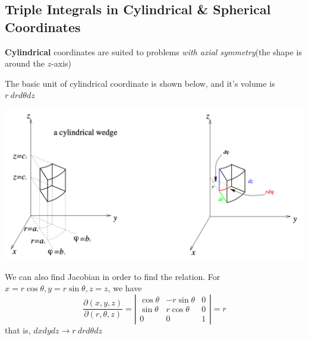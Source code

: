 \begin{spacing}{1.3}
    \newpage
    \section{Triple Integrals in Cylindrical \& Spherical Coordinates}

    {\bf Cylindrical} coordinates are suited to problems {\it with axial symmetry}(the shape 
    is around the $z$-axis)

    The basic unit of cylindrical coordinate is shown below, and it's volume is $r\ drd\theta dz$
    \begin{center}
        \includegraphics[scale=0.43]{images/Ch14-int-cylind.png}
    \end{center}
    We can also find Jacobian in order to find the relation. For $x=r\cos \theta, y=r\sin\theta,z=z$, we have
    $$\frac{\partial(x,y,z)}{\partial(r,\theta,z)}=
    \left|\begin{array}{ccc}
        \cos\theta & -r\sin\theta & 0\\
        \sin\theta & r\cos\theta & 0\\
        0 & 0 & 1
    \end{array}\right|=r$$
    that is, $dxdydz\rightarrow r\ drd\theta dz$

    \vspace{0.2in}
    \begin{center}
    \end{center}


\end{spacing}
